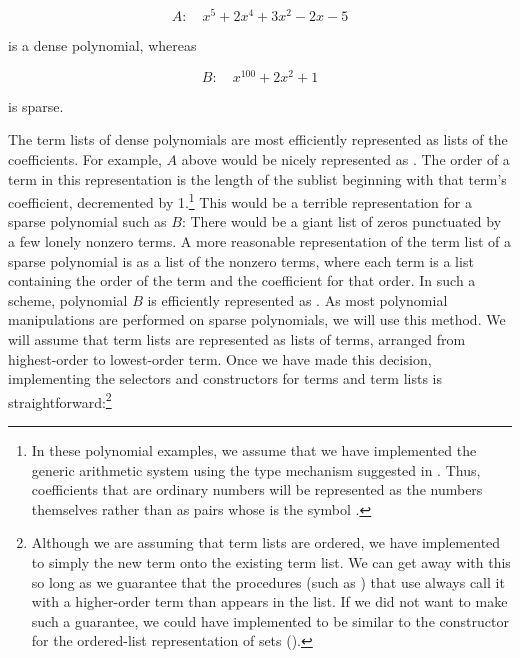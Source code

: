 $$ A: \quad x^5 + 2x^4 + 3x^2 - 2x - 5 $$

\noindent
is a dense polynomial, whereas
\begin{comment}

\begin{example}
B : x^100 + 2x^2 + 1
\end{example}

\end{comment}

$$ B: \quad x^{100} + 2x^2 + 1 $$

\noindent
is sparse.

The term lists of dense polynomials are most efficiently represented as lists
of the coefficients.  For example, \( A \) above would be nicely represented as
.  The order of a term in this representation is the
length of the sublist beginning with that term's coefficient, decremented by
1.\footnote{In these polynomial examples, we assume that we have implemented
the generic arithmetic system using the type mechanism suggested in
.  Thus, coefficients that are ordinary numbers will be
represented as the numbers themselves rather than as pairs whose  is
the symbol .}  This would be a terrible representation for
a sparse polynomial such as \( B \): There would be a giant list of zeros
punctuated by a few lonely nonzero terms.  A more reasonable representation of
the term list of a sparse polynomial is as a list of the nonzero terms, where
each term is a list containing the order of the term and the coefficient for
that order.  In such a scheme, polynomial \( B \) is efficiently represented as
.  As most polynomial manipulations are performed
on sparse polynomials, we will use this method.  We will assume that term lists
are represented as lists of terms, arranged from highest-order to lowest-order
term.  Once we have made this decision, implementing the selectors and
constructors for terms and term lists is straightforward:\footnote{Although we
are assuming that term lists are ordered, we have implemented
 to simply  the new term onto the existing term
list.  We can get away with this so long as we guarantee that the procedures
(such as ) that use  always call it with a
higher-order term than appears in the list.  If we did not want to make such a
guarantee, we could have implemented  to be similar to the
 constructor for the ordered-list representation of sets
().}


